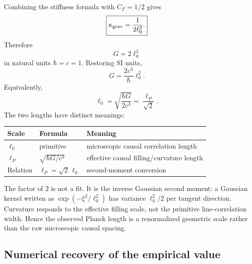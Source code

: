\documentclass[11pt]{article}
\begin{document}
Combining the stiffness formula with $C_F=1/2$ gives
\begin{equation}
\boxed{\kappa_{\rm grav}=\frac{1}{2\ell_0^2}.}
\end{equation}
Therefore
\begin{equation}
\boxed{G=2\ell_0^2}
\end{equation}
in natural units $\hbar=c=1$. Restoring SI units,
\begin{equation}
\boxed{G=\frac{2c^3}{\hbar}\ell_0^2.}
\end{equation}
Equivalently,
\begin{equation}
\boxed{\ell_0=\sqrt{\frac{\hbar G}{2c^3}}=\frac{\ell_P}{\sqrt2}.}
\end{equation}
The two lengths have distinct meanings:
\begin{center}
\begin{tabular}{lll}
\toprule
Scale & Formula & Meaning\\
\midrule
$\ell_0$ & primitive & microscopic causal correlation length\\
$\ell_P$ & $\sqrt{\hbar G/c^3}$ & effective causal filling/curvature length\\
Relation & $\ell_P=\sqrt2\,\ell_0$ & second-moment conversion\\
\bottomrule
\end{tabular}
\end{center}

The factor of $2$ is not a fit. It is the inverse Gaussian second moment: a Gaussian kernel written as $\exp(-\xi^2/\ell_0^2)$ has variance $\ell_0^2/2$ per tangent direction. Curvature responds to the effective filling scale, not the primitive line-correlation width. Hence the observed Planck length is a renormalized geometric scale rather than the raw microscopic causal spacing.

\subsection{Numerical recovery of the empirical value}
\end{document}
